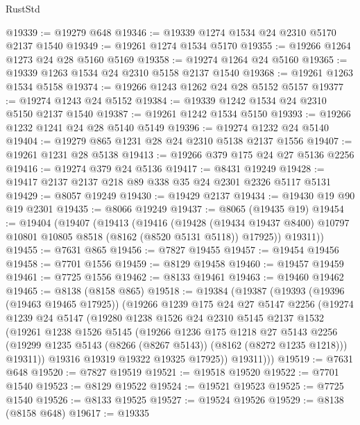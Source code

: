 \begin{lexlean}{RustStd}
\begin{coremodule}
@19339 := @19279 @648
@19346 := @19339 @1274 @1534 @24 @2310 @5170 @2137 @1540
@19349 := @19261 @1274 @1534 @5170
@19355 := @19266 @1264 @1273 @24 @28 @5160 @5169
@19358 := @19274 @1264 @24 @5160
@19365 := @19339 @1263 @1534 @24 @2310 @5158 @2137 @1540
@19368 := @19261 @1263 @1534 @5158
@19374 := @19266 @1243 @1262 @24 @28 @5152 @5157
@19377 := @19274 @1243 @24 @5152
@19384 := @19339 @1242 @1534 @24 @2310 @5150 @2137 @1540
@19387 := @19261 @1242 @1534 @5150
@19393 := @19266 @1232 @1241 @24 @28 @5140 @5149
@19396 := @19274 @1232 @24 @5140
@19404 := @19279 @865 @1231 @28 @24 @2310 @5138 @2137 @1556
@19407 := @19261 @1231 @28 @5138
@19413 := @19266 @379 @175 @24 @27 @5136 @2256
@19416 := @19274 @379 @24 @5136
@19417 := @8431 @19249
@19428 := @19417 @2137 @2137 @218 @89 @338 @35 @24 @2301 @2326 @5117 @5131
@19429 := @8057 @19249
@19430 := @19429 @2137
@19434 := @19430 @19 @90 @19 @2301
@19435 := @8066 @19249
@19437 := @8065 (@19435 @19)
@19454 := @19404
    (@19407
      (@19413
        (@19416
          (@19428
            (@19434 @19437 @8400)
            @10797
            @10801
            @10805
            @8518
            (@8162 (@8520 @5131 @5118))
            @17925))
        @19311))
@19455 := @7631 @865
@19456 := @7827 @19455
@19457 := @19454 @19456
@19458 := @7701 @1556
@19459 := @8129 @19458
@19460 := @19457 @19459
@19461 := @7725 @1556
@19462 := @8133 @19461
@19463 := @19460 @19462
@19465 := @8138 (@8158 @865)
@19518 := @19384
    (@19387
      (@19393
        (@19396 (@19463 @19465 @17925))
        (@19266
          @1239
          @175
          @24
          @27
          @5147
          @2256
          (@19274
            @1239
            @24
            @5147
            (@19280
              @1238
              @1526
              @24
              @2310
              @5145
              @2137
              @1532
              (@19261
                @1238
                @1526
                @5145
                (@19266
                  @1236
                  @175
                  @1218
                  @27
                  @5143
                  @2256
                  (@19299 @1235 @5143 (@8266 (@8267 @5143)) (@8162 (@8272 @1235 @1218)))
                  @19311))
              @19316
              @19319
              @19322
              @19325
              @17925))
          @19311)))
@19519 := @7631 @648
@19520 := @7827 @19519
@19521 := @19518 @19520
@19522 := @7701 @1540
@19523 := @8129 @19522
@19524 := @19521 @19523
@19525 := @7725 @1540
@19526 := @8133 @19525
@19527 := @19524 @19526
@19529 := @8138 (@8158 @648)
@19617 := @19335

\end{coremodule}
\end{lexlean}
